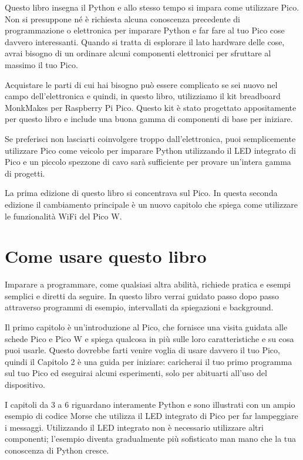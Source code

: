 Questo libro insegna il Python e allo stesso tempo si impara come utilizzare Pico. Non si presuppone né è richiesta alcuna conoscenza precedente di programmazione o elettronica per imparare Python e far fare al tuo Pico cose davvero interessanti.
Quando si tratta di esplorare il lato hardware delle cose, avrai bisogno di un ordinare alcuni componenti elettronici per sfruttare al massimo il tuo Pico.

Acquistare le parti di cui hai bisogno può essere complicato se sei nuovo nel campo dell'elettronica e quindi, in questo libro, utilizziamo il kit breadboard MonkMakes per Raspberry Pi Pico. Questo kit è stato progettato appositamente per questo libro e include una buona gamma di componenti di base per iniziare.

Se preferisci non lasciarti coinvolgere troppo dall'elettronica, puoi semplicemente utilizzare Pico come veicolo per imparare Python utilizzando il LED integrato di Pico e un piccolo spezzone di cavo sarà sufficiente per provare un'intera gamma di progetti.

La prima edizione di questo libro si concentrava sul Pico. In questa seconda edizione il cambiamento principale è un nuovo capitolo che spiega come utilizzare le funzionalità WiFi del Pico W.

\section*{Come usare questo libro}
Imparare a programmare, come qualsiasi altra abilità, richiede pratica e esempi semplici e diretti da seguire. In questo libro verrai guidato passo dopo passo attraverso programmi di esempio, intervallati da spiegazioni e background.

Il primo capitolo è un'introduzione al Pico, che fornisce una visita guidata alle schede Pico e Pico W e spiega qualcosa in più sulle loro caratteristiche e su cosa puoi usarle. Questo dovrebbe farti venire voglia di usare davvero il tuo Pico, quindi il Capitolo 2 è una guida per iniziare: caricherai il tuo primo programma sul tuo Pico ed eseguirai alcuni esperimenti, solo per abituarti all'uso del dispositivo.

I capitoli da 3 a 6 riguardano interamente Python e sono illustrati con un ampio esempio di codice Morse che utilizza il LED integrato di Pico per far lampeggiare i messaggi. Utilizzando il LED integrato non è necessario utilizzare altri componenti; l'esempio diventa gradualmente più sofisticato man mano che la tua conoscenza di Python cresce.

